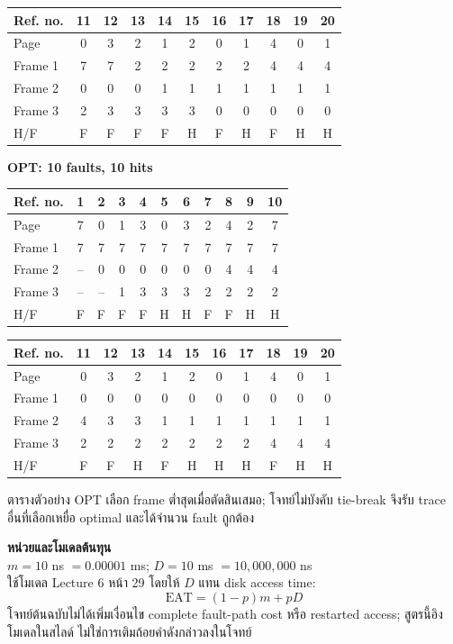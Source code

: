 {\setlength{\tabcolsep}{5pt}\begin{center}\renewcommand{\arraystretch}{1.15}\begin{tabular}{l|cccccccccc}
Ref. no. & 11 & 12 & 13 & 14 & 15 & 16 & 17 & 18 & 19 & 20\\\hline
Page & 0 & 3 & 2 & 1 & 2 & 0 & 1 & 4 & 0 & 1\\
Frame 1 & 7 & 7 & 2 & 2 & 2 & 2 & 2 & 4 & 4 & 4\\
Frame 2 & 0 & 0 & 0 & 1 & 1 & 1 & 1 & 1 & 1 & 1\\
Frame 3 & 2 & 3 & 3 & 3 & 3 & 0 & 0 & 0 & 0 & 0\\
H/F & F & F & F & F & H & F & H & F & H & H\\
\end{tabular}\end{center}}
\newpage{}
\noindent\textbf{OPT: 10 faults, 10 hits}
{\setlength{\tabcolsep}{5pt}\begin{center}\renewcommand{\arraystretch}{1.15}\begin{tabular}{l|cccccccccc}
Ref. no. & 1 & 2 & 3 & 4 & 5 & 6 & 7 & 8 & 9 & 10\\\hline
Page & 7 & 0 & 1 & 3 & 0 & 3 & 2 & 4 & 2 & 7\\
Frame 1 & 7 & 7 & 7 & 7 & 7 & 7 & 7 & 7 & 7 & 7\\
Frame 2 & -- & 0 & 0 & 0 & 0 & 0 & 0 & 4 & 4 & 4\\
Frame 3 & -- & -- & 1 & 3 & 3 & 3 & 2 & 2 & 2 & 2\\
H/F & F & F & F & F & H & H & F & F & H & H\\
\end{tabular}\end{center}}
{\setlength{\tabcolsep}{5pt}\begin{center}\renewcommand{\arraystretch}{1.15}\begin{tabular}{l|cccccccccc}
Ref. no. & 11 & 12 & 13 & 14 & 15 & 16 & 17 & 18 & 19 & 20\\\hline
Page & 0 & 3 & 2 & 1 & 2 & 0 & 1 & 4 & 0 & 1\\
Frame 1 & 0 & 0 & 0 & 0 & 0 & 0 & 0 & 0 & 0 & 0\\
Frame 2 & 4 & 3 & 3 & 1 & 1 & 1 & 1 & 1 & 1 & 1\\
Frame 3 & 2 & 2 & 2 & 2 & 2 & 2 & 2 & 4 & 4 & 4\\
H/F & F & F & H & F & H & H & H & F & H & H\\
\end{tabular}\end{center}}
\noindent ตารางตัวอย่าง OPT เลือก frame ต่ำสุดเมื่อตัดสินเสมอ; โจทย์ไม่บังคับ tie-break จึงรับ trace อื่นที่เลือกเหยื่อ optimal และได้จำนวน fault ถูกต้อง\par
\newpage{}
\noindent\textbf{หน่วยและโมเดลต้นทุน}\\
$m=10$ ns $=0.00001$ ms; $D=10$ ms $=10{,}000{,}000$ ns\\
ใช้โมเดล Lecture 6 หน้า 29 โดยให้ $D$ แทน disk access time:
\[\mathrm{EAT}=(1-p)m+pD\]
โจทย์ต้นฉบับไม่ได้เพิ่มเงื่อนไข complete fault-path cost หรือ restarted access; สูตรนี้อิงโมเดลในสไลด์ ไม่ใช่การเติมถ้อยคำดังกล่าวลงในโจทย์

